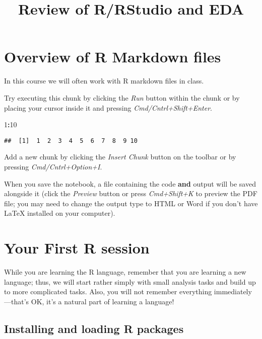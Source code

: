 \documentclass[]{article}
\title{Review of R/RStudio and EDA}
\author{}
\date{}
\newenvironment{Shaded}{\begin{snugshade}}{\end{snugshade}}
\newcommand{\DecValTok}[1]{\textcolor[rgb]{0.00,0.00,0.81}{#1}}
\newcommand{\OperatorTok}[1]{\textcolor[rgb]{0.81,0.36,0.00}{\textbf{#1}}}
\begin{document}
\maketitle

\section{Overview of R Markdown
files}\label{overview-of-r-markdown-files}

In this course we will often work with R markdown files in class.

Try executing this chunk by clicking the \emph{Run} button within the
chunk or by placing your cursor inside it and pressing
\emph{Cmd/Cntrl+Shift+Enter}.

\begin{Shaded}
\begin{Highlighting}[]
\DecValTok{1}\OperatorTok{:}\DecValTok{10}
\end{Highlighting}
\end{Shaded}

\begin{verbatim}
##  [1]  1  2  3  4  5  6  7  8  9 10
\end{verbatim}

Add a new chunk by clicking the \emph{Insert Chunk} button on the
toolbar or by pressing \emph{Cmd/Cntrl+Option+I}.

When you save the notebook, a file containing the code \textbf{and}
output will be saved alongside it (click the \emph{Preview} button or
press \emph{Cmd+Shift+K} to preview the PDF file; you may need to change
the output type to HTML or Word if you don't have LaTeX installed on
your computer).

\section{Your First R session}\label{your-first-r-session}

While you are learning the R language, remember that you are learning a
new language; thus, we will start rather simply with small analysis
tasks and build up to more complicated tasks. Also, you will not
remember everything immediately---that's OK, it's a natural part of
learning a language!

\subsection{Installing and loading R
packages}\label{installing-and-loading-r-packages}
\end{document}
